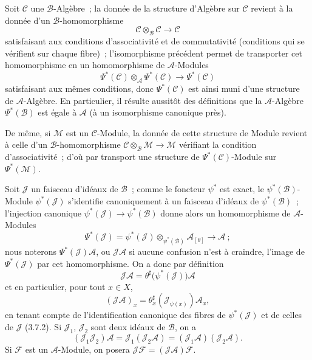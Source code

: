 \begin{env}[4.3.4]
\label{0.4.3.4-fr}
Soit $\mathcal{C}$ une $\mathcal{B}$-Algèbre~; la donnée de la structure
d'Algèbre sur $\mathcal{C}$ revient à la donnée d'un $\mathcal{B}$-homomorphisme
\[
  \mathcal{C}\otimes_{\mathcal{B}}\mathcal{C}\longrightarrow\mathcal{C}
\]
satisfaisant aux conditions d'associativité et de commutativité (conditions
qui se vérifient sur chaque fibre)~; l'isomorphisme précédent permet de
transporter cet homomorphisme en un homomorphisme de $\mathcal{A}$-Modules
\[
  \Psi^*(\mathcal{C})\otimes_{\mathcal{A}}\Psi^*(\mathcal{C})
  \longrightarrow\Psi^*(\mathcal{C})
\]
satisfaisant aux mêmes conditions, donc $\Psi^*(\mathcal{C})$ est ainsi muni
d'une structure de $\mathcal{A}$-Algèbre. En particulier, il résulte aussitôt
des définitions que la $\mathcal{A}$-Algèbre $\Psi^*(\mathcal{B})$ est égale à
$\mathcal{A}$ (à un isomorphisme canonique près).

De même, si $\mathcal{M}$ est un $\mathcal{C}$-Module, la donnée de cette
structure de Module revient
à celle d'un $\mathcal{B}$-homomorphisme
$\mathcal{C}\otimes_{\mathcal{B}}\mathcal{M}\to\mathcal{M}$ vérifiant la
condition d'associativité~; d'où par transport une structure de
$\Psi^*(\mathcal{C})$-Module sur $\Psi^*(\mathcal{M})$.
\end{env}

\begin{env}[4.3.5]
\label{0.4.3.5-fr}
Soit $\mathcal{J}$ un faisceau d'idéaux de $\mathcal{B}$~; comme le foncteur
$\psi^*$ est exact, le $\psi^*(\mathcal{B})$-Module $\psi^*(\mathcal{J})$
s'identifie canoniquement à un faisceau d'idéaux de $\psi^*(\mathcal{B})$~;
l'injection canonique $\psi^*(\mathcal{J})\to\psi^*(\mathcal{B})$ donne alors
un homomorphisme de $\mathcal{A}$-Modules
\[
  \Psi^*(\mathcal{J})
  =\psi^*(\mathcal{J})\otimes_{\psi^*(\mathcal{B})}\mathcal{A}_{[\theta]}
  \longrightarrow\mathcal{A}~;
\]
nous noterons $\Psi^*(\mathcal{J})\mathcal{A}$, ou
$\mathcal{J}\mathcal{A}$ si aucune confusion n'est à craindre, l'image de
$\Psi^*(\mathcal{J})$ par cet homomorphisme. On a donc par définition
\[
  \mathcal{J}\mathcal{A}
  =\theta^\sharp\bigl(\psi^*(\mathcal{J})\bigr)\mathcal{A}
\]
et en particulier, pour tout $x\in X$,
\[
  (\mathcal{J}\mathcal{A})_x
  =\theta_x^\sharp(\mathcal{J}_{\psi(x)})\mathcal{A}_x,
\]
en tenant compte de l'identification canonique des fibres de
$\psi^*(\mathcal{J})$ et de celles de $\mathcal{J}$ (3.7.2). Si
$\mathcal{J}_1$, $\mathcal{J}_2$ sont deux idéaux de $\mathcal{B}$, on a
\[
  (\mathcal{J}_1\mathcal{J}_2)\mathcal{A}
  =\mathcal{J}_1(\mathcal{J}_2\mathcal{A})
  =(\mathcal{J}_1\mathcal{A})(\mathcal{J}_2\mathcal{A}).
\]
Si $\mathcal{F}$ est un $\mathcal{A}$-Module, on posera
$\mathcal{J}\mathcal{F}=(\mathcal{J}\mathcal{A})\mathcal{F}$.
\end{env}

